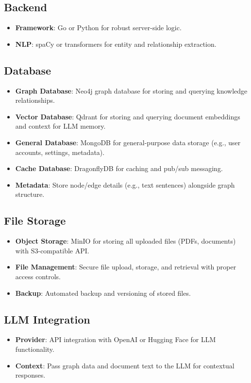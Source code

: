 \documentclass[%
 reprint,
 amsmath,amssymb,
 aps,
]{revtex4-2}
\begin{document}
\subsection{\label{sec:backend}Backend}
\begin{itemize}
\item \textbf{Framework}: Go or Python for robust server-side logic.
\item \textbf{NLP}: spaCy or transformers for entity and relationship extraction.
\end{itemize}

\subsection{\label{sec:database}Database}
\begin{itemize}
\item \textbf{Graph Database}: Neo4j graph database for storing and querying knowledge relationships.
\item \textbf{Vector Database}: Qdrant for storing and querying document embeddings and context for LLM memory.
\item \textbf{General Database}: MongoDB for general-purpose data storage (e.g., user accounts, settings, metadata).
\item \textbf{Cache Database}: DragonflyDB for caching and pub/sub messaging.
\item \textbf{Metadata}: Store node/edge details (e.g., text sentences) alongside graph structure.
\end{itemize}

\subsection{\label{sec:file_storage}File Storage}
\begin{itemize}
\item \textbf{Object Storage}: MinIO for storing all uploaded files (PDFs, documents) with S3-compatible API.
\item \textbf{File Management}: Secure file upload, storage, and retrieval with proper access controls.
\item \textbf{Backup}: Automated backup and versioning of stored files.
\end{itemize}

\subsection{\label{sec:llm_integration}LLM Integration}
\begin{itemize}
\item \textbf{Provider}: API integration with OpenAI or Hugging Face for LLM functionality.
\item \textbf{Context}: Pass graph data and document text to the LLM for contextual responses.
\end{itemize}
\end{document}
